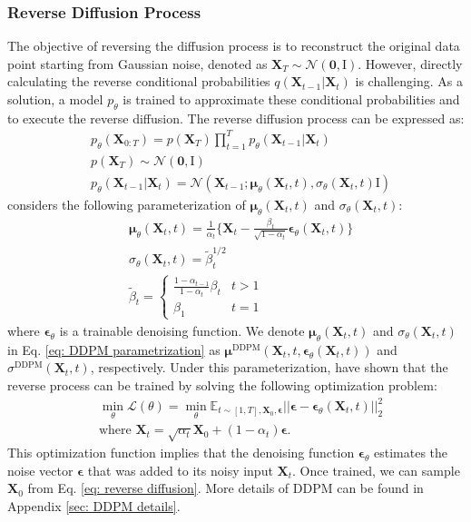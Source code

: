 \documentclass[11pt]{article}
\begin{document}
\subsubsection*{Reverse Diffusion Process}

The objective of reversing the diffusion process is to reconstruct the original data point starting from Gaussian noise, denoted as $\bm{X}_T \sim \mathcal{N}(\bm{0}, \bm{\mathrm{I}})$. However, directly calculating the reverse conditional probabilities $q(\bm{X}_{t-1}|\bm{X}_t)$ is challenging. As a solution, a model $p_{\theta}$ is trained to approximate these conditional probabilities and to execute the reverse diffusion. The reverse diffusion process can be expressed as:
\begin{align}\label{eq: reverse diffusion}
	&p_{\theta}(\bm{X}_{0:T})=p(\bm{X}_T)\prod_{t=1}^Tp_{\theta}(\bm{X}_{t-1}|\bm{X}_t)\\
	&p(\bm{X}_T)\sim \mathcal{N}(\bm{0}, \bm{\mathrm{I}})\\
	&p_{\theta}(\bm{X}_{t-1}|\bm{X}_t)=\mathcal{N}(\bm{X}_{t-1};\bm{\mu}_{\theta}(\bm{X}_t, t), \sigma_{\theta}(\bm{X}_t, t)\bm{\mathrm{I}})
\end{align}
\citep{ho2020denoising} considers the following parameterization of $\bm{\mu}_{\theta}(\bm{X}_t, t)$ and $\sigma_{\theta}(\bm{X}_t, t)$:
\begin{align}\label{eq: DDPM parametrization}
	&\bm{\mu}_{\theta}(\bm{X}_t, t)=\frac{1}{\alpha_t}\{\bm{X}_t-\frac{\beta_t}{\sqrt{1-\alpha_t}}\bm{\epsilon}_{\theta}(\bm{X}_t, t)\}\\
	&\sigma_{\theta}(\bm{X}_t, t)=\tilde{\beta}_t^{1/2}\\
	&\tilde{\beta}_t= \begin{cases}\frac{1-\alpha_{t-1}}{1-\alpha_t} \beta_t & t>1 \\ \beta_1 & t=1\end{cases}
\end{align}
where $\bm{\epsilon}_{\theta}$ is a trainable denoising function. We denote $\bm{\mu}_{\theta}(\bm{X}_t,t)$ and $\sigma_{\theta}(\bm{X}_t, t)$ in Eq. \ref{eq: DDPM parametrization} as $\bm{\mu}^{\mathrm{DDPM}}(\bm{X}_t, t, \bm{\epsilon}_{\theta}(\bm{X}_t, t))$ and $\sigma^{\mathrm{DDPM}}(\bm{X}_t, t)$, respectively. Under this parameterization, \citet{ho2020denoising} have shown that the reverse process can be trained by solving the following optimization problem:
\begin{align}
	&\min_{\theta}\mathcal{L}(\theta)=\min_{\theta}\mathbb{E}_{t\sim [1,T],\bm{X}_0,\bm{\epsilon}}||\bm{\epsilon}-\bm{\epsilon}_{\theta}(\bm{X}_t, t)||^2_2\\
	&\mbox{where } \bm{X}_t=\sqrt{\alpha_t}\bm{X}_0+(1-\alpha_t)\bm{\epsilon}.
\end{align}
This optimization function implies that the denoising function $\bm{\epsilon}_{\theta}$ estimates the noise vector $\bm{\epsilon}$ that was added to its noisy input $\bm{X}_t$. Once trained, we can sample $\bm{X}_0$ from Eq. \ref{eq: reverse diffusion}. More details of DDPM can be found in Appendix \ref{sec: DDPM details}.
\end{document}

